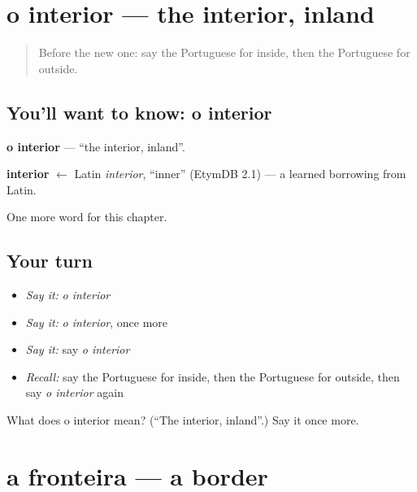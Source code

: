 \section[o interior]{o interior — the interior, inland}

\label{lesson:PT-C213-interior}



\begin{quote}
Before the new one: say the Portuguese for inside, then the Portuguese for outside.
\end{quote}

\subsection*{You'll want to know: o interior}
\textbf{o interior} — \textquotedblleft{}the interior, inland\textquotedblright{}.

\begin{cousinweb}
\textbf{interior} $\leftarrow$ Latin \emph{interior}, \textquotedblleft{}inner\textquotedblright{} (EtymDB 2.1) — a learned borrowing from Latin.
\end{cousinweb}

\begin{grammarlens}[title={What you've built}]
One more word for this chapter.
\end{grammarlens}

\subsection*{Your turn}
\begin{itemize}
\raggedright
  \item \emph{Say it:} \emph{o interior}
  \item \emph{Say it:} \emph{o interior}, once more
  \item \emph{Say it:} say \emph{o interior}
  \item \emph{Recall:} say the Portuguese for inside, then the Portuguese for outside, then say \emph{o interior} again
\end{itemize}

\begin{tcolorbox}[breakable,colback=teal!4,colframe=teal!35!black,title={Before you move on}]
What does o interior mean? (\textquotedblleft{}The interior, inland\textquotedblright{}.) Say it once more.
\end{tcolorbox}
\section[a fronteira]{a fronteira — a border}

